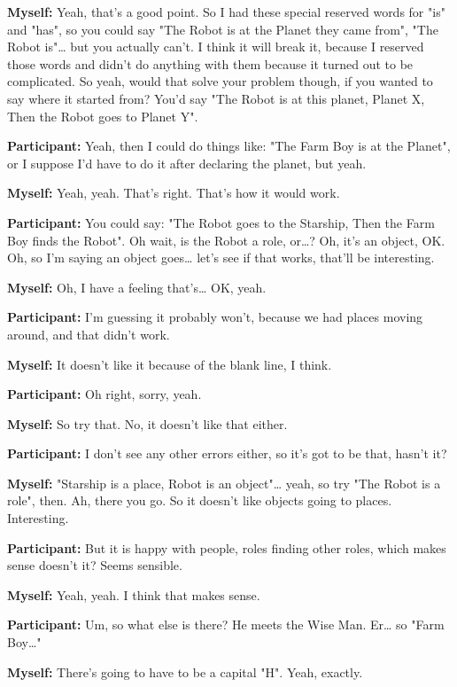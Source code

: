 \documentclass[11pt]{report}
\begin{document}
\begin{linenumbers}
\textbf{Myself:} Yeah, that's a good point. So I had these special reserved words for "is" and "has", so you could say "The Robot is at the Planet they came from", "The Robot is"\ldots{} but you actually can't. I think it will break it, because I reserved those words and didn't do anything with them because it turned out to be complicated. So yeah, would that solve your problem though, if you wanted to say where it started from? You'd say "The Robot is at this planet, Planet X, Then the Robot goes to Planet Y".

\textbf{Participant:} Yeah, then I could do things like: "The Farm Boy is at the Planet", or I suppose I'd have to do it after declaring the planet, but yeah.

\textbf{Myself:} Yeah, yeah. That's right. That's how it would work.

\textbf{Participant:} You could say: "The Robot goes to the Starship, Then the
Farm Boy finds the Robot". Oh wait, is the Robot a role, or\ldots{}? Oh, it's an
object, OK. Oh, so I'm saying an object goes\ldots{} let's see if that works,
that'll be interesting.

\textbf{Myself:} Oh, I have a feeling that's\ldots{} OK, yeah.

\textbf{Participant:} I'm guessing it probably won't, because we had places moving around, and that didn't work.

\textbf{Myself:} It doesn't like it because of the blank line, I think.

\textbf{Participant:} Oh right, sorry, yeah.

\textbf{Myself:} So try that. No, it doesn't like that either.

\textbf{Participant:} I don't see any other errors either, so it's got to be that, hasn't it?

\textbf{Myself:} "Starship is a place, Robot is an object"\ldots{} yeah, so try "The Robot is a role", then. Ah, there you go. So it doesn't like objects going to places. Interesting.

\textbf{Participant:} But it is happy with people, roles finding other roles, which makes sense doesn't it? Seems sensible.

\textbf{Myself:} Yeah, yeah. I think that makes sense.

\textbf{Participant:} Um, so what else is there? He meets the Wise Man. Er\ldots{} so "Farm Boy\ldots{}"

\textbf{Myself:} There's going to have to be a capital "H". Yeah, exactly.


\end{linenumbers}
\end{document}

